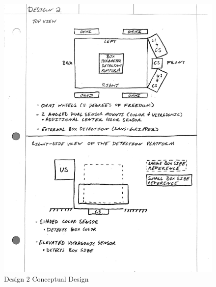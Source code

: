\documentclass[12pt]{report}
\begin{document}
\begin{figure}[H]
    \centering
    \includegraphics[width=1\textwidth]{Images/Designs/Design2.pdf}
    \caption{Design 2 Conceptual Design}
    \label{fig:design2}
\end{figure}
\end{document}
